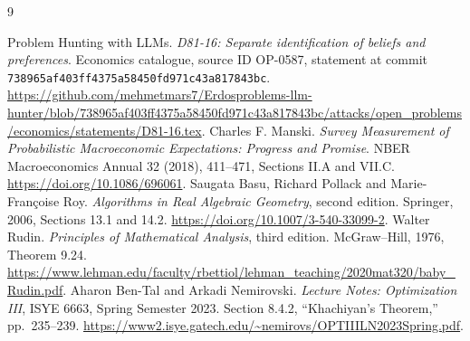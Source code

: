 \documentclass[11pt]{article}
\begin{document}
\begin{thebibliography}{9}
\raggedright
{} Problem Hunting with LLMs.
\emph{D81-16: Separate identification of beliefs and preferences}.
Economics catalogue, source ID OP-0587, statement at commit
\texttt{738965af403ff4375a58450fd971c43a817843bc}.
\url{https://github.com/mehmetmars7/Erdosproblems-llm-hunter/blob/738965af403ff4375a58450fd971c43a817843bc/attacks/open_problems/economics/statements/D81-16.tex}.
 Charles F. Manski.
\emph{Survey Measurement of Probabilistic Macroeconomic Expectations: Progress and Promise}.
NBER Macroeconomics Annual 32 (2018), 411--471, Sections II.A and VII.C.
\url{https://doi.org/10.1086/696061}.
 Saugata Basu, Richard Pollack and Marie-Fran\c{c}oise Roy.
\emph{Algorithms in Real Algebraic Geometry}, second edition.
Springer, 2006, Sections 13.1 and 14.2.
\url{https://doi.org/10.1007/3-540-33099-2}.
 Walter Rudin.
\emph{Principles of Mathematical Analysis}, third edition.
McGraw--Hill, 1976, Theorem 9.24.
\url{https://www.lehman.edu/faculty/rbettiol/lehman_teaching/2020mat320/baby_Rudin.pdf}.
 Aharon Ben-Tal and Arkadi Nemirovski.
\emph{Lecture Notes: Optimization III}, ISYE 6663, Spring Semester 2023.
Section 8.4.2, ``Khachiyan's Theorem,'' pp.\ 235--239.
\url{https://www2.isye.gatech.edu/~nemirovs/OPTIIILN2023Spring.pdf}.
\end{thebibliography}
\end{document}
